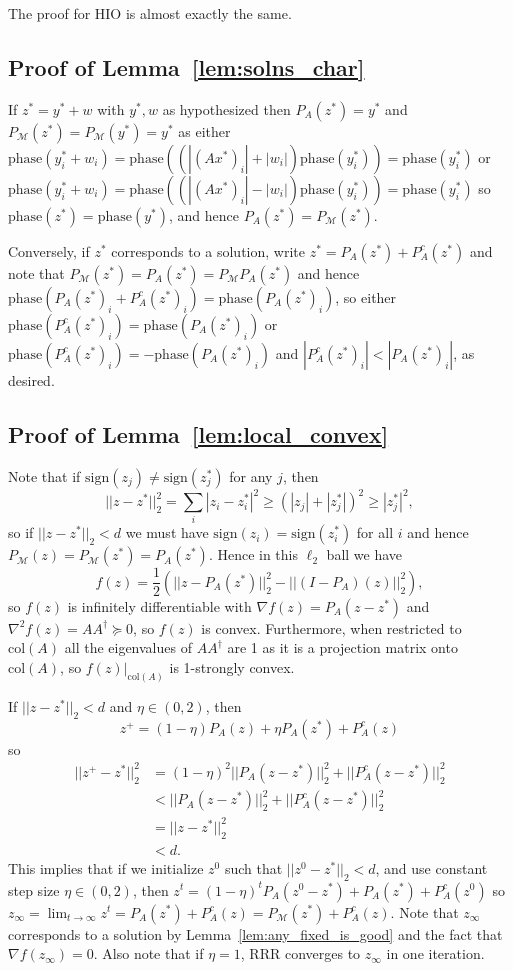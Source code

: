 \documentclass[12pt]{article}
\theoremstyle{definition}
\theoremstyle{remark}
\theoremstyle{definition}
\theoremstyle{problem}
\theoremstyle{definition}
\newcommand{\col}{\text{col}}
\newcommand{\sign}{\text{sign}}
\newcommand{\phase}{\text{phase}}
\newcommand{\MM}{\mathcal{M}}
\begin{document}
The proof for HIO is almost exactly the same.

\subsection{Proof of Lemma~\ref{lem:solns_char}}\label{sec:pf_solns_char}

If $z^* = y^*+w$ with $y^*,w$ as hypothesized then $P_A(z^*)=y^*$ and $P_{\MM}(z^*) = P_{\MM}(y^*)=y^*$ as either $\phase(y^*_i+w_i) = \phase((|(Ax^*)_i|+|w_i|)\phase(y^*_i))=\phase(y^*_i)$ or $\phase(y^*_i+w_i) = \phase((|(Ax^*)_i|-|w_i|)\phase(y^*_i))=\phase(y^*_i)$ so $\phase(z^*)=\phase(y^*)$, and hence $P_A(z^*)=P_{\MM}(z^*)$.

Conversely, if $z^*$ corresponds to a solution, write $z^* = P_A(z^*) + P_A^c(z^*)$ and note that $P_{\MM}(z^*) = P_A(z^*) = P_{\MM}P_A(z^*)$ and hence $\phase(P_A(z^*)_i + P_A^c(z^*)_i) = \phase(P_A(z^*)_i)$, so either $\phase(P_A^c(z^*)_i)=\phase(P_A(z^*)_i)$ or $\phase(P_A^c(z^*)_i)=-\phase(P_A(z^*)_i)$ and $|P_A^c(z^*)_i|<|P_A(z^*)_i|$, as desired.

\subsection{Proof of Lemma~\ref{lem:local_convex}}\label{sec:pf_local_convex}

Note that if $\sign(z_j)\neq \sign(z^*_j)$ for any $j$, then
\[ ||z-z^*||_2^2 = \sum_i|z_i-z^*_i|^2 \geq (|z_j| + |z^*_j|)^2 \geq |z^*_j|^2,\]
so if $||z-z^*||_2<d$ we must have $\sign(z_i)=\sign(z^*_i)$ for all $i$ and hence $P_{\MM}(z)=P_{\MM}(z^*)=P_A(z^*)$. Hence in this $\ell_2$ ball we have
\[ f(z) = \frac{1}{2}\left(||z-P_A(z^*)||_2^2 - ||(I-P_A)(z)||_2^2\right),\]
so $f(z)$ is infinitely differentiable with $\nabla f(z) = P_A(z-z^*)$ and $\nabla^2 f(z) = AA^{\dagger}\succeq 0$, so $f(z)$ is convex. Furthermore, when restricted to $\col(A)$ all the eigenvalues of $AA^{\dagger}$ are 1 as it is a projection matrix onto $\col(A)$, so $f(z)|_{\col(A)}$ is 1-strongly convex.

If $||z-z^*||_2<d$ and $\eta\in(0,2)$, then $$z^+ = (1-\eta)P_A(z) + \eta P_A(z^*) + P_A^c(z)$$ so
\[\begin{aligned} ||z^+-z^*||_2^2 &= (1-\eta)^2||P_A(z-z^*)||_2^2 + ||P_A^c(z-z^*)||_2^2\\
&< ||P_A(z-z^*)||_2^2 + ||P_A^c(z-z^*)||_2^2\\
&= ||z-z^*||_2^2 \\& < d.\end{aligned}\]
This implies that if we initialize $z^0$ such that $||z^0-z^*||_2<d$, and use constant step size $\eta\in(0,2)$, then $z^t = (1-\eta)^tP_A(z^0-z^*) + P_A(z^*) + P_A^c(z^0)$ so $z_{\infty}=\lim_{t\to\infty}z^t = P_A(z^*) + P_A^c(z) = P_{\MM}(z^*) + P_A^c(z)$. Note that $z_{\infty}$ corresponds to a solution by Lemma~\ref{lem:any_fixed_is_good} and the fact that $\nabla f(z_{\infty}) = 0$. Also note that if $\eta = 1$, RRR converges to $z_{\infty}$ in one iteration.
\end{document}
